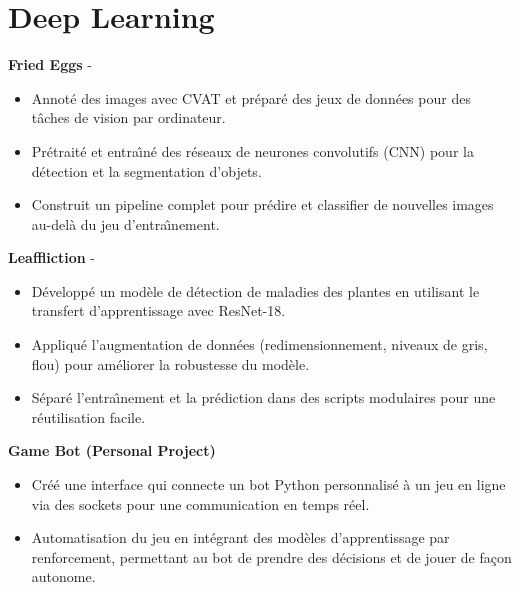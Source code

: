 \documentclass[a4paper,11pt]{article}%
\begin{document}
\section*{Deep Learning}%
%
\noindent \textbf{Fried Eggs} - \href{https://github.com/sboof911/Fried-eggs}{{}}%
\begin{itemize}[leftmargin=2em,label={},parsep=0pt,topsep=1em]%
\item Annot\'e des images avec CVAT et pr\'epar\'e des jeux de donn\'ees pour des t\^aches de vision par ordinateur.%
\item Pr\'etrait\'e et entra{\^\i}n\'e des r\'eseaux de neurones convolutifs (CNN) pour la d\'etection et la segmentation d'objets.%
\item Construit un pipeline complet pour pr\'edire et classifier de nouvelles images au-del\`a du jeu d'entra{\^\i}nement.%
\end{itemize}%
%
\noindent \textbf{Leaffliction} - \href{https://github.com/sboof911/Leaffliction}{{}}%
\begin{itemize}[leftmargin=2em,label={},parsep=0pt,topsep=1em]%
\item D\'evelopp\'e un mod\`ele de d\'etection de maladies des plantes en utilisant le transfert d'apprentissage avec ResNet-18.%
\item Appliqu\'e l'augmentation de donn\'ees (redimensionnement, niveaux de gris, flou) pour am\'eliorer la robustesse du mod\`ele.%
\item S\'epar\'e l'entra{\^\i}nement et la pr\'ediction dans des scripts modulaires pour une r\'eutilisation facile.%
\end{itemize}%
%
\noindent \textbf{Game Bot (Personal Project)}%
\begin{itemize}[leftmargin=2em,label={},parsep=0pt,topsep=1em]%
\item Cr\'e\'e une interface qui connecte un bot Python personnalis\'e \`a un jeu en ligne via des sockets pour une communication en temps r\'eel.%
\item Automatisation du jeu en int\'egrant des mod\`eles d'apprentissage par renforcement, permettant au bot de prendre des d\'ecisions et de jouer de fa\c{c}on autonome.%
\end{itemize}%
\end{document}
